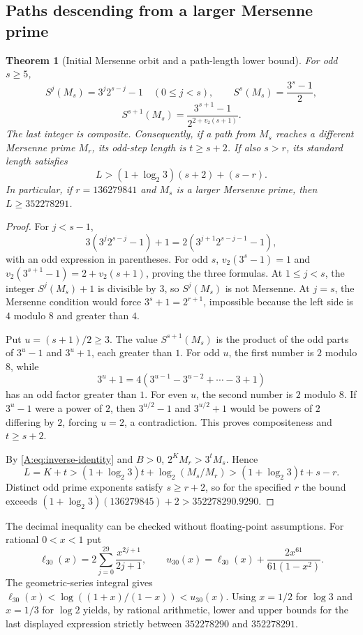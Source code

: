 \documentclass[11pt,a4paper]{article}
\newtheorem{theorem}{Theorem}[section]
\theoremstyle{definition}
\theoremstyle{remark}
\numberwithin{equation}{section}
\begin{document}
\subsection{Paths descending from a larger Mersenne prime}
\begin{theorem}[Initial Mersenne orbit and a path-length lower bound]
\label{A:thm:mersenne-path-length}
For odd $s\ge5$,
\[
 S^j(M_s)=3^j2^{s-j}-1\quad(0\le j<s),
 \qquad S^s(M_s)=\frac{3^s-1}{2},
\]
\[
 S^{s+1}(M_s)=\frac{3^{s+1}-1}{2^{2+v_2(s+1)}}.
\]
The last integer is composite. Consequently, if a path from $M_s$
reaches a different Mersenne prime $M_r$, its odd-step length is
$t\ge s+2$. If also $s>r$, its standard length satisfies
\begin{equation}
 L>(1+\log_2 3)(s+2)+(s-r).
 \label{A:eq:mersenne-length}
\end{equation}
In particular, if $r=136279841$ and $M_s$ is a larger Mersenne prime,
then $L\ge352278291$.
\end{theorem}
\begin{proof}
For $j<s-1$,
\[
 3(3^j2^{s-j}-1)+1=2(3^{j+1}2^{s-j-1}-1),
\]
with an odd expression in parentheses. For odd $s$,
$v_2(3^s-1)=1$ and $v_2(3^{s+1}-1)=2+v_2(s+1)$, proving the
three formulas. At $1\le j<s$, the integer $S^j(M_s)+1$ is divisible
by $3$, so $S^j(M_s)$ is not Mersenne. At $j=s$, the Mersenne condition
would force $3^s+1=2^{r+1}$, impossible because the left side is
$4$ modulo $8$ and greater than $4$.

Put $u=(s+1)/2\ge3$. The value $S^{s+1}(M_s)$ is the product of the
odd parts of $3^u-1$ and $3^u+1$, each greater than $1$.
For odd $u$, the first number is $2$ modulo $8$, while
\[
 3^u+1=4(3^{u-1}-3^{u-2}+\cdots-3+1)
\]
has an odd factor greater than $1$. For even $u$, the second number is
$2$ modulo $8$. If $3^u-1$ were a power of $2$, then
$3^{u/2}-1$ and $3^{u/2}+1$ would be powers of $2$ differing by $2$,
forcing $u=2$, a contradiction. This proves compositeness and $t\ge s+2$.

By \eqref{A:eq:inverse-identity} and $B>0$,
$2^KM_r>3^tM_s$. Hence
\[
 L=K+t>(1+\log_2 3)t+\log_2(M_s/M_r)
 >(1+\log_2 3)t+s-r.
\]
Distinct odd prime exponents satisfy $s\ge r+2$, so for the specified
$r$ the bound exceeds
$(1+\log_2 3)(136279845)+2>352278290.9290$.
\end{proof}
The decimal inequality can be checked without floating-point assumptions.
For rational $0<x<1$ put
\[
 \ell_{30}(x)=2\sum_{j=0}^{29}\frac{x^{2j+1}}{2j+1},\qquad
 u_{30}(x)=\ell_{30}(x)+\frac{2x^{61}}{61(1-x^2)}.
\]
The geometric-series integral gives
$\ell_{30}(x)<\log((1+x)/(1-x))<u_{30}(x)$.
Using $x=1/2$ for $\log3$ and $x=1/3$ for $\log2$ yields, by rational
arithmetic, lower and upper bounds for the last displayed expression
strictly between $352278290$ and $352278291$.
\end{document}
